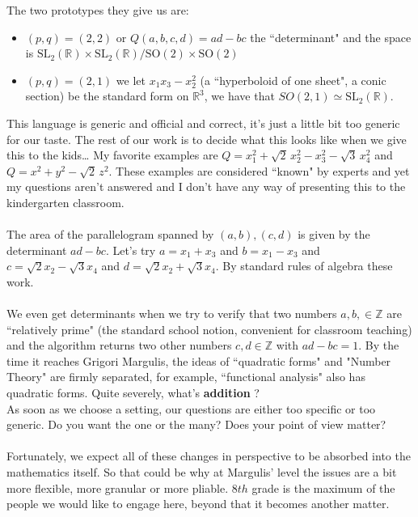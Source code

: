 \documentclass[12pt]{article}
\begin{document}
The two prototypes they give us are:
\begin{itemize}
\item $(p,q) = (2,2)$ or $Q(a,b,c,d) = ad-bc$ the ``determinant" and the space is $\text{SL}_2(\mathbb{R}) \times \text{SL}_2(\mathbb{R}) / \text{SO}(2) \times \text{SO}(2) $
\item $(p,q) = (2,1)$ we let $x_1 x_3 - x_2^2 $ (a ``hyperboloid of one sheet", a conic section) be the standard form on $\mathbb{R}^3$, we have that $SO(2,1) \simeq \text{SL}_2(\mathbb{R})$. 
\end{itemize}
This language is generic and official and correct, it's just a little bit too generic for our taste. The rest of our work is to decide what this looks like when we give this to the kids\dots  \newpage
\noindent My favorite examples are $Q = x_1^2 + \sqrt{2}\, x_2^2 - x_3^2 - \sqrt{3}\, x_4^2$ and $Q = x^2 + y^2 - \sqrt{2} \, z^2$.  These examples are considered ``known" by experts and yet my questions aren't answered and I don't have any way of presenting this to the kindergarten classroom. \\ \\ 
The area of the parallelogram spanned by $(a,b), (c,d)$ is given by the determinant $ad-bc$.  Let's try $a = x_1 + x_3 $ and $b = x_1 - x_3$ and $c = \sqrt{2} x_2 - \sqrt{3} x_4$  and $d = \sqrt{2}x_2 + \sqrt{3}x_4$.  By standard rules of algebra these work.\\ \\
We even get determinants when we try to verify that two numbers $a, b, \in \mathbb{Z}$ are ``relatively prime" (the standard school notion, convenient for classroom teaching) and the algorithm returns two other numbers $c, d \in \mathbb{Z}$ with $ad - bc = 1$.  By the time it reaches Grigori Margulis, the ideas of  ``quadratic forms" and "Number Theory" are firmly separated, for example, ``functional analysis" also has quadratic forms.  Quite severely, what's \textbf{addition} ?  \\ As soon as we choose a setting, our questions are either too specific or too generic.  Do you want the one or the many?  Does your point of view matter? \\ \\
Fortunately, we expect all of these changes in perspective to be absorbed into the mathematics itself.  So that could be why at Margulis' level the issues are a bit more flexible, more granular or more pliable.  $8th$ grade is the maximum of the people we would like to engage here, beyond that it becomes another matter.  \\ 
\end{document}
